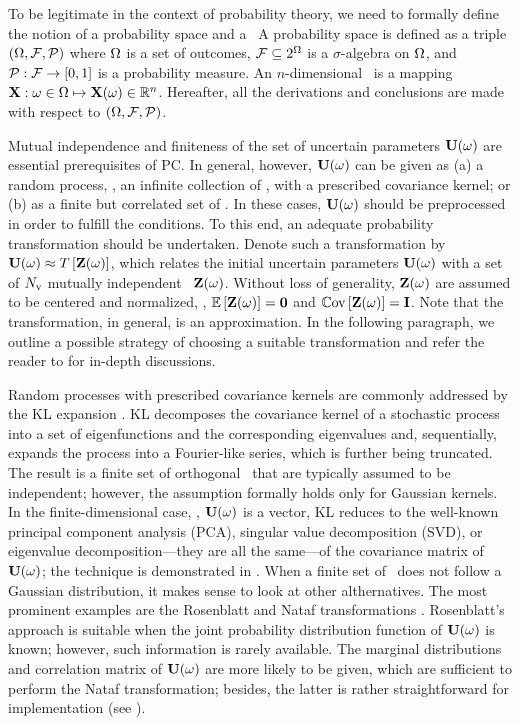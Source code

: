 To be legitimate in the context of probability theory, we need to formally define the notion of a probability space and a \rv\ A probability space  \cite{maitre2010} is defined as a triple $(\Omega, \mathcal{F}, \mathcal{P})$ where $\Omega$ is a set of outcomes, $\mathcal{F} \subseteq 2^\Omega$ is a $\sigma$-algebra on $\Omega$, and $\mathcal{P}: \mathcal{F} \to [0, 1]$ is a probability measure. An $n$-dimensional \rv\ is a mapping $\mathbf{X}: \omega \in \Omega \mapsto \mathbf{X}(\omega) \in \mathbb{R}^n$. Hereafter, all the derivations and conclusions are made with respect to $(\Omega, \mathcal{F}, \mathcal{P})$.

Mutual independence and finiteness of the set of uncertain parameters $\mathbf{U}(\omega)$ are essential prerequisites of PC. In general, however, $\mathbf{U}(\omega)$ can be given as (a) a random process, \ie, an infinite collection of \rvs, with a prescribed covariance kernel; or (b) as a finite but correlated set of \rvs. In these cases, $\mathbf{U}(\omega)$ should be preprocessed in order to fulfill the conditions. To this end, an adequate probability transformation should be undertaken. Denote such a transformation by $\mathbf{U}(\omega) \approx T\left[\mathbf{Z}(\omega)\right]$, which relates the initial uncertain parameters $\mathbf{U}(\omega)$ with a set of ${N_\text{v}}$ mutually independent \rvs\ $\mathbf{Z}(\omega)$. Without loss of generality, $\mathbf{Z}(\omega)$ are assumed to be centered and normalized, \ie, $\oExp{\vZ(\o)} = \mZero$ and $\oCov{\vZ(\o)} = \mI$. Note that the transformation, in general, is an approximation. In the following paragraph, we outline a possible strategy of choosing a suitable transformation and refer the reader to \cite{xiu2010, eldred2009} for in-depth discussions.

Random processes with prescribed covariance kernels are commonly addressed by the KL expansion \cite{xiu2010, maitre2010, ghanem1991}. KL decomposes the covariance kernel of a stochastic process into a set of eigenfunctions and the corresponding eigenvalues and, sequentially, expands the process into a Fourier-like series, which is further being truncated. The result is a finite set of orthogonal \rvs\ that are typically assumed to be independent; however, the assumption formally holds only for Gaussian kernels. In the finite-dimensional case, \ie, $\mathbf{U}(\omega)$ is a vector, KL reduces to the well-known principal component analysis (PCA), singular value decomposition (SVD), or eigenvalue decomposition---they are all the same---of the covariance matrix of $\mathbf{U}(\omega)$; the technique is demonstrated in . When a finite set of \rvs\ does not follow a Gaussian distribution, it makes sense to look at other althernatives. The most prominent examples are the Rosenblatt and Nataf transformations \cite{eldred2009}. Rosenblatt's approach is suitable when the joint probability distribution function of $\mathbf{U}(\omega)$ is known; however, such information is rarely available. The marginal distributions and correlation matrix of $\mathbf{U}(\omega)$ are more likely to be given, which are sufficient to perform the Nataf transformation; besides, the latter is rather straightforward for implementation (see \cite{li2008}).
